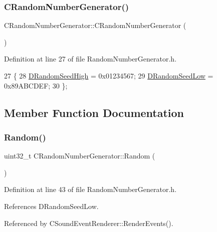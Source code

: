 \subsubsection{\texorpdfstring{C\+Random\+Number\+Generator()}{CRandomNumberGenerator()}}
{\footnotesize\ttfamily C\+Random\+Number\+Generator\+::\+C\+Random\+Number\+Generator (\begin{DoxyParamCaption}{ }\end{DoxyParamCaption})\hspace{0.3cm}{\ttfamily [inline]}}



Definition at line 27 of file Random\+Number\+Generator.\+h.


\begin{DoxyCode}
27                                 \{
28             \hyperlink{classCRandomNumberGenerator_a450670f954d6ccb3cc39d7eebbf889c6}{DRandomSeedHigh} = 0x01234567;
29             \hyperlink{classCRandomNumberGenerator_a33bf3bb9bc1378f4142932a01a3e2cfd}{DRandomSeedLow} = 0x89ABCDEF;
30         \};
\end{DoxyCode}


\subsection{Member Function Documentation}
\hypertarget{classCRandomNumberGenerator_aa7fc51bde5647d15df2f1b9826702ca2}{}\label{classCRandomNumberGenerator_aa7fc51bde5647d15df2f1b9826702ca2} 
\subsubsection{\texorpdfstring{Random()}{Random()}}
{\footnotesize\ttfamily uint32\+\_\+t C\+Random\+Number\+Generator\+::\+Random (\begin{DoxyParamCaption}{ }\end{DoxyParamCaption})\hspace{0.3cm}{\ttfamily [inline]}}



Definition at line 43 of file Random\+Number\+Generator.\+h.



References D\+Random\+Seed\+Low.



Referenced by C\+Sound\+Event\+Renderer\+::\+Render\+Events().


